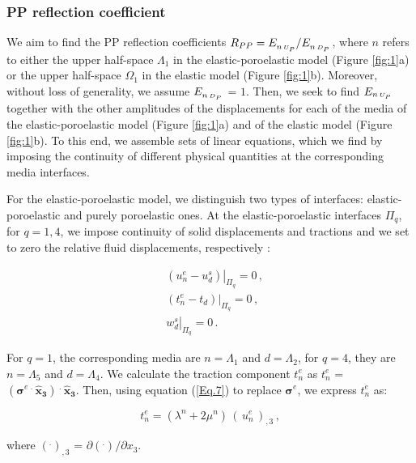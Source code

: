 \documentclass[draft]{agujournal2019}
\begin{document}
\subsubsection{PP reflection coefficient}
We aim to find the PP reflection coefficients $R_{PP} = \tensor*[]{E}{_n_{\, \text{\tiny $U_P$}}}/ \tensor[]{E}{_n_{\, \text{\tiny $D_P$}}}$, where  $n$ refers to either the upper half-space $ \Lambda_1$ in the elastic-poro\-elastic model (Figure \ref{fig:1}a) or the upper half-space $\Omega_1$ in the elastic model  (Figure \ref{fig:1}b).
Moreover, without loss of generality, we assume $ \tensor[]{E}{_n_{\, \text{\tiny $D_P$}}}$ = $1$. Then, we seek to find ${E}_{n\, \text{\tiny $U_P$}}$ together with the other amplitudes of the displacements for each of the media 
of the elastic-poroelastic model (Figure \ref{fig:1}a)
and of the elastic model (Figure \ref{fig:1}b).
To this end,
we assemble sets of linear equations, which we find by imposing the continuity of different physical quantities at the corresponding media interfaces.

For the elastic-poroelastic model, we distinguish two types of interfaces: elastic-poroelastic and purely poroelastic ones. At the elastic-poroelastic interfaces $\Pi_q$, for  $q=1,4$,
we impose continuity of solid displacements and tractions and we set to zero the relative fluid displacements, respectively \cite{Deresiewicz1963}: 
\begin{linenomath*}
\begin{equation}\label{Eq.13}
\begin{split}
&  \left. \left(  u_n^e -  u_d^s \right) \right \rvert_{\Pi_q} = 0 \,, \\
&  \left. \left(  t_n^e -  t_d \right) \right \rvert_{\Pi_q} = 0 \,,\\
& \left.  w_d^s \right \rvert_{\Pi_q} = 0 \,.
\end{split}
\end{equation}
\end{linenomath*}
For $q=1$, the corresponding media are $n=\Lambda_1$ and $d=\Lambda_2$, for $q=4$, they are $n=\Lambda_5$ and $d=\Lambda_4$.
We calculate the traction component $t_n^e$ as $t_n^e$ = $ ({\bm{\sigma}^e} \,^{\bm{.}} \,\bm{\hat x_3}) \, ^{\bm{.}} \, \bm{\hat x_3}$. Then, using equation (\ref{Eq.7}) to replace $\bm{\sigma}^e$, we express $t_n^e$ as:
\begin{linenomath*}
\begin{equation}\label{Eq.14}
t_n^e =(\lambda^n + 2 \mu^n)\,  \left( \, u_n^{e} \, \right)_{,3} \,,
\end{equation}
\end{linenomath*}
where  $(^.)_{,3}$ = $\partial (^.)/ \partial{x_3}$. 
\end{document}

